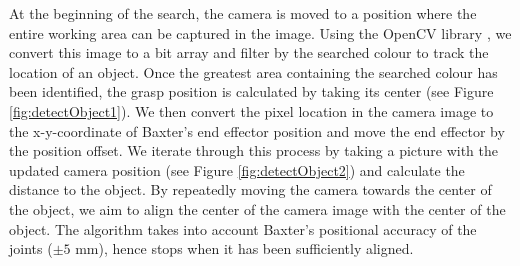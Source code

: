 At the beginning of the search, the camera is moved to a position where the entire working area can be captured in the image.
Using the OpenCV library \cite{opencv}, we convert this image to a bit array and filter by the searched colour to track the location of an object. 
Once the greatest area containing the searched colour has been identified, the grasp position is calculated by taking its center (see Figure \ref{fig:detectObject1}). 
We then convert the pixel location in the camera image to the x-y-coordinate of Baxter's end effector position and move the end effector by the position offset.
We iterate through this process by taking a picture with the updated camera position (see Figure \ref{fig:detectObject2}) and calculate the distance to the object. By repeatedly moving the camera towards the center of the object, we aim to align the center of the camera image with the center of the object. The algorithm takes into account Baxter's positional accuracy of the joints ($\pm 5$ mm), hence stops when it has been sufficiently aligned.
